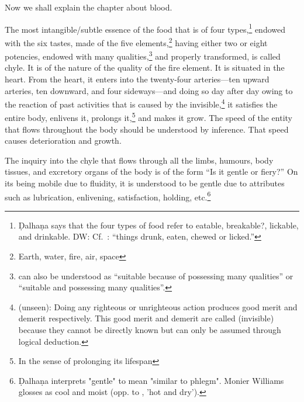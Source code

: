 \begin{translation}    
\item [1] Now we shall explain the chapter about blood.

\item [2]

    
\item [3] The most intangible/subtle essence of the food that is of four
types,\footnote{Ḍalhaṇa says that the four types of food refer to
    eatable, breakable?, lickable, and drinkable. DW: Cf.\, : 
     “things drunk, eaten, chewed or licked.”} 
    endowed 
    with the six
    tastes, made of the five elements,\footnote{Earth, water, fire, air,
        space} having either two or eight potencies, endowed with many
        qualities,\footnote{ can also be understood as
            “suitable because of possessing many qualities” or “suitable and
            possessing many qualities”.} and properly transformed, is called chyle.
            It is of the nature of the quality of the fire element. It is situated in
            the heart. From the heart, it enters into the twenty-four arteries—ten
            upward arteries, ten downward, and four sideways—and doing so day after
            day owing to the reaction of past activities that is caused by the
            invisible,\footnote{ (unseen): Doing any righteous or
                unrighteous action produces good merit and demerit respectively. This
                good merit and demerit are called  (invisible) because they
                cannot be directly known but can only be assumed through logical
                deduction.} it satisfies the entire body, enlivens it, prolongs
                it,\footnote{In the sense of prolonging its lifespan} and makes it grow.
                    The speed of the entity that flows throughout the body should be
                    understood by inference. That speed causes deterioration and growth.
    
    The inquiry into the chyle that flows through all the limbs, humours, body tissues, 
    and excretory organs of the body is of the form “Is it gentle or fiery?” On its being 
    mobile due to fluidity, it is understood to be gentle due to attributes such as 
    lubrication, enlivening, satisfaction, holding, etc.\footnote{Ḍalhaṇa interprets 
    "gentle" to mean "similar to phlegm". Monier Williams glosses  as 
    cool and moist (opp. to , 'hot and dry').} 
    

\end{translation}
